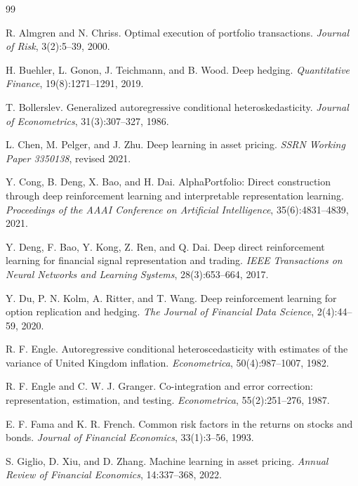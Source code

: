 \documentclass[10pt,twocolumn]{article}
\begin{document}
\begin{thebibliography}{99}

R. Almgren and N. Chriss.
\newblock Optimal execution of portfolio transactions.
\newblock \emph{Journal of Risk}, 3(2):5--39, 2000.

H. Buehler, L. Gonon, J. Teichmann, and B. Wood.
\newblock Deep hedging.
\newblock \emph{Quantitative Finance}, 19(8):1271--1291, 2019.

T. Bollerslev.
\newblock Generalized autoregressive conditional heteroskedasticity.
\newblock \emph{Journal of Econometrics}, 31(3):307--327, 1986.

L. Chen, M. Pelger, and J. Zhu.
\newblock Deep learning in asset pricing.
\newblock \emph{SSRN Working Paper 3350138}, revised 2021.

Y. Cong, B. Deng, X. Bao, and H. Dai.
\newblock AlphaPortfolio: Direct construction through deep reinforcement learning
  and interpretable representation learning.
\newblock \emph{Proceedings of the AAAI Conference on Artificial Intelligence},
  35(6):4831--4839, 2021.

Y. Deng, F. Bao, Y. Kong, Z. Ren, and Q. Dai.
\newblock Deep direct reinforcement learning for financial signal representation
  and trading.
\newblock \emph{IEEE Transactions on Neural Networks and Learning Systems},
  28(3):653--664, 2017.

Y. Du, P. N. Kolm, A. Ritter, and T. Wang.
\newblock Deep reinforcement learning for option replication and hedging.
\newblock \emph{The Journal of Financial Data Science}, 2(4):44--59, 2020.

R. F. Engle.
\newblock Autoregressive conditional heteroscedasticity with estimates of the
  variance of United Kingdom inflation.
\newblock \emph{Econometrica}, 50(4):987--1007, 1982.

R. F. Engle and C. W. J. Granger.
\newblock Co-integration and error correction: representation, estimation, and
  testing.
\newblock \emph{Econometrica}, 55(2):251--276, 1987.

E. F. Fama and K. R. French.
\newblock Common risk factors in the returns on stocks and bonds.
\newblock \emph{Journal of Financial Economics}, 33(1):3--56, 1993.

S. Giglio, D. Xiu, and D. Zhang.
\newblock Machine learning in asset pricing.
\newblock \emph{Annual Review of Financial Economics}, 14:337--368, 2022.


\end{thebibliography}
\end{document}
